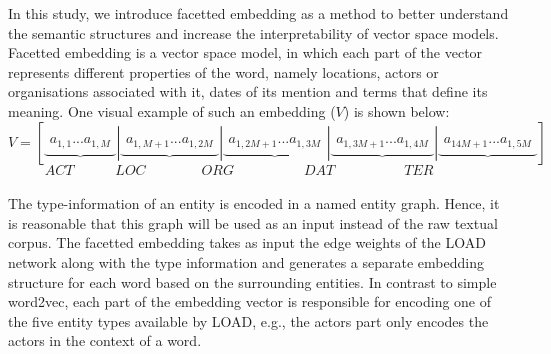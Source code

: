 In this study, we introduce facetted embedding as a method to better understand the semantic structures and increase the interpretability of vector space models. Facetted embedding is a vector space model, in which each part of the vector represents different properties of the word, namely  locations, actors or organisations associated with it, dates of its mention and terms that define its meaning. One visual example of such an embedding ($V$) is shown below: \\
\mathleft
\begin{equation}
V=\left[ \underbrace { \begin{matrix}{ a }_{ 1,1 } ... { a }_{ 1,M } \end{matrix} } |\underbrace { \begin{matrix}{ a }_{ 1,M+1 } ... { a }_{ 1,2M } \end{matrix} } |\underbrace { \begin{matrix}{ a }_{ 1,2M+1 } ... { a }_{ 1,3M } \end{matrix} } |\underbrace { \begin{matrix}{ a }_{ 1,3M+1 } ... { a }_{ 1,4M } \end{matrix} } |\underbrace { \begin{matrix}{ a }_{ 14M+1 } ... { a }_{ 1,5M } \end{matrix} }  \right] 
\label{eq:concat_vec}
\end{equation}
$$ \quad  ACT \quad  \qquad  LOC\qquad \qquad ORG\qquad \quad \qquad DAT\qquad \quad  \qquad  TER\qquad \qquad$$
\mathcenter
\\
The type-information of an entity is encoded in a named entity graph. Hence, it is reasonable that this graph will be used as an input instead of the raw textual corpus. The facetted embedding takes as input the edge weights of the LOAD network along with the type information and generates a separate embedding structure for each word based on the surrounding entities. In contrast to simple word2vec, each part of the embedding vector is responsible for encoding one of the five entity types available by LOAD, e.g., the actors part only encodes the actors in the context of a word.\\
